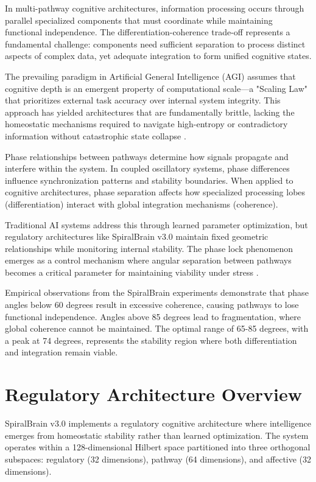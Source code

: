 \documentclass[12pt,a4paper]{article}
\begin{document}
In multi-pathway cognitive architectures, information processing occurs through parallel specialized components that must coordinate while maintaining functional independence. The differentiation-coherence trade-off represents a fundamental challenge: components need sufficient separation to process distinct aspects of complex data, yet adequate integration to form unified cognitive states.

The prevailing paradigm in Artificial General Intelligence (AGI) assumes that cognitive depth is an emergent property of computational scale—a "Scaling Law" that prioritizes external task accuracy over internal system integrity. This approach has yielded architectures that are fundamentally brittle, lacking the homeostatic mechanisms required to navigate high-entropy or contradictory information without catastrophic state collapse \cite{Cragin2026RI}.

Phase relationships between pathways determine how signals propagate and interfere within the system. In coupled oscillatory systems, phase differences influence synchronization patterns and stability boundaries. When applied to cognitive architectures, phase separation affects how specialized processing lobes (differentiation) interact with global integration mechanisms (coherence).

Traditional AI systems address this through learned parameter optimization, but regulatory architectures like SpiralBrain v3.0 maintain fixed geometric relationships while monitoring internal stability. The phase lock phenomenon emerges as a control mechanism where angular separation between pathways becomes a critical parameter for maintaining viability under stress \cite{Cragin2026RI}.

Empirical observations from the SpiralBrain experiments demonstrate that phase angles below 60 degrees result in excessive coherence, causing pathways to lose functional independence. Angles above 85 degrees lead to fragmentation, where global coherence cannot be maintained. The optimal range of 65-85 degrees, with a peak at 74 degrees, represents the stability region where both differentiation and integration remain viable.

\section{Regulatory Architecture Overview}

SpiralBrain v3.0 implements a regulatory cognitive architecture where intelligence emerges from homeostatic stability rather than learned optimization. The system operates within a 128-dimensional Hilbert space partitioned into three orthogonal subspaces: regulatory (32 dimensions), pathway (64 dimensions), and affective (32 dimensions).
\end{document}
